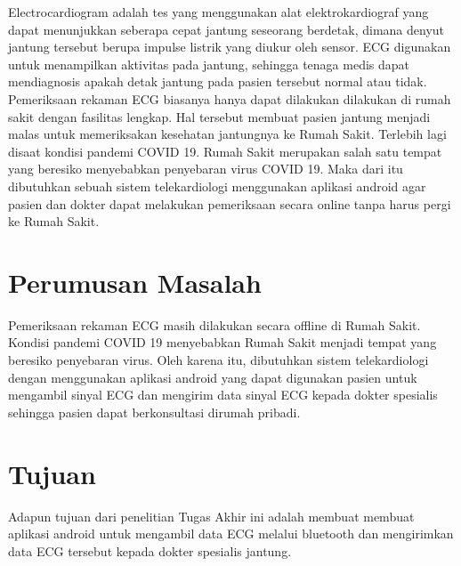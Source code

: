 \hspace{2mm} Electrocardiogram adalah tes yang menggunakan alat elektrokardiograf yang dapat menunjukkan seberapa cepat jantung seseorang berdetak, dimana denyut jantung tersebut berupa impulse listrik yang diukur oleh sensor. ECG digunakan untuk menampilkan aktivitas pada jantung, sehingga tenaga medis dapat mendiagnosis apakah detak jantung pada pasien tersebut normal atau tidak. Pemeriksaan rekaman ECG biasanya hanya dapat dilakukan
dilakukan di rumah sakit dengan fasilitas lengkap. Hal tersebut membuat pasien jantung menjadi malas untuk memeriksakan kesehatan jantungnya ke Rumah Sakit. Terlebih lagi disaat kondisi pandemi COVID 19. Rumah Sakit merupakan salah satu tempat yang beresiko menyebabkan penyebaran virus COVID 19. Maka dari itu dibutuhkan sebuah sistem telekardiologi menggunakan aplikasi android agar pasien dan dokter dapat melakukan pemeriksaan secara online tanpa harus pergi ke Rumah Sakit. 

\vspace{1ex} 

\section{Perumusan Masalah}
\vspace{1ex}

Pemeriksaan rekaman ECG masih dilakukan secara offline di Rumah Sakit. Kondisi pandemi COVID 19 menyebabkan Rumah Sakit menjadi tempat yang beresiko penyebaran virus. Oleh karena itu, dibutuhkan sistem telekardiologi dengan menggunakan aplikasi android yang dapat digunakan pasien untuk mengambil sinyal ECG dan mengirim data sinyal ECG kepada dokter spesialis sehingga pasien dapat berkonsultasi dirumah pribadi.

\vspace{1ex}

\section{Tujuan}
\vspace{1ex}

Adapun tujuan dari penelitian Tugas Akhir ini adalah membuat membuat aplikasi android untuk mengambil data ECG melalui bluetooth dan mengirimkan data ECG tersebut kepada dokter spesialis jantung.
\vspace{1ex}


